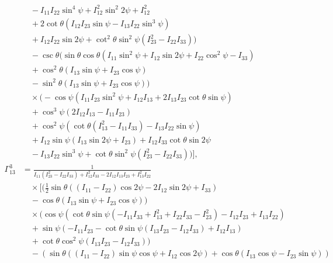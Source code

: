 \documentclass[lineno, pdflatex,sn-mathphys-ay]{sn-jnl}
\theoremstyle{thmstyleone}%
\theoremstyle{thmstyletwo}%
\theoremstyle{thmstylethree}%
\begin{document}
\begin{appendices}
\begin{align}
    &\quad -I_{11} I_{22} \sin ^4\psi+I_{12}^2 \sin ^2 2\psi+I_{12}^2 \nonumber \\
    &\quad +2 \cot \theta \left(I_{12} I_{23} \sin \psi-I_{13} I_{22} \sin ^3\psi\right) \nonumber \\
    &\quad +I_{12} I_{22} \sin 2\psi+\cot ^2\theta \sin ^2\psi \left(I_{23}^2-I_{22} I_{33}\right)\bigg) \nonumber \\
    &\quad -\csc \theta \Big(\sin \theta \cos \theta \left(I_{11} \sin ^2\psi+I_{12} \sin 2\psi+I_{22} \cos ^2\psi-I_{33}\right) \nonumber \\
    &\quad +\cos ^2\theta (I_{13} \sin \psi+I_{23} \cos \psi) \nonumber \\
    &\quad -\sin ^2\theta (I_{13} \sin \psi+I_{23} \cos \psi)\Big) \nonumber \\
    &\quad \times \bigg(-\cos \psi \left(I_{11} I_{23} \sin ^2\psi+I_{12} I_{13}+2 I_{13} I_{23} \cot \theta \sin \psi\right) \nonumber \\
    &\quad +\cos ^3\psi (2 I_{12} I_{13}-I_{11} I_{23}) \nonumber \\
    &\quad +\cos ^2\psi \left(\cot \theta \left(I_{13}^2-I_{11} I_{33}\right)-I_{13} I_{22} \sin \psi\right) \nonumber \\
    &\quad +I_{12} \sin \psi (I_{13} \sin 2\psi+I_{23}) +I_{12} I_{33} \cot \theta \sin 2\psi \nonumber \\
    &\quad -I_{13} I_{22} \sin ^3\psi+\cot \theta \sin ^2\psi \left(I_{23}^2-I_{22} I_{33}\right)\bigg) \bigg], \nonumber \\
    \Gamma^{3}_{13} &= \frac{1}{I_{11} \left(I_{23}^2-I_{22} I_{33}\right)+I_{12}^2 I_{33}-2 I_{12} I_{13} I_{23}+I_{13}^2 I_{22}} \nonumber \\
    &\quad \times \bigg[ \bigg(\frac{1}{2} \sin \theta ((I_{11}-I_{22}) \cos 2\psi-2 I_{12} \sin 2\psi+I_{33}) \nonumber \\
    &\quad -\cos \theta (I_{13} \sin \psi+I_{23} \cos \psi)\bigg) \nonumber \\
    &\quad \times \bigg(\cos \psi \left(\cot \theta \sin \psi \left(-I_{11} I_{33}+I_{13}^2+I_{22} I_{33}-I_{23}^2\right)-I_{12} I_{23}+I_{13} I_{22}\right) \nonumber \\
    &\quad +\sin \psi (-I_{11} I_{23}-\cot \theta \sin \psi (I_{13} I_{23}-I_{12} I_{33})+I_{12} I_{13}) \nonumber \\
    &\quad +\cot \theta \cos ^2\psi (I_{13} I_{23}-I_{12} I_{33})\bigg) \nonumber \\
    &\quad -(\sin \theta ((I_{11}-I_{22}) \sin \psi \cos \psi+I_{12} \cos 2\psi)+\cos \theta (I_{13} \cos \psi-I_{23} \sin \psi)) \nonumber \\

\end{align}
\end{appendices}
\end{document}
